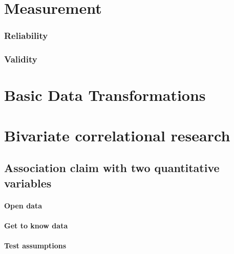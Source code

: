 \documentclass[
]{book}
\begin{document}
\hypertarget{measurement}{%
\chapter{Measurement}\label{measurement}}

\hypertarget{reliability}{%
\subsection{Reliability}\label{reliability}}

\hypertarget{validity}{%
\subsection{Validity}\label{validity}}

\hypertarget{basic-data-transformations}{%
\chapter{Basic Data Transformations}\label{basic-data-transformations}}

\hypertarget{bivariate-correlational-research}{%
\chapter{Bivariate correlational research}\label{bivariate-correlational-research}}

\hypertarget{association-claim-with-two-quantitative-variables}{%
\section{Association claim with two quantitative variables}\label{association-claim-with-two-quantitative-variables}}

\hypertarget{open-data}{%
\subsubsection{Open data}\label{open-data}}

\hypertarget{get-to-know-data}{%
\subsubsection{Get to know data}\label{get-to-know-data}}

\hypertarget{test-assumptions}{%
\subsubsection{Test assumptions}\label{test-assumptions}}
\end{document}
